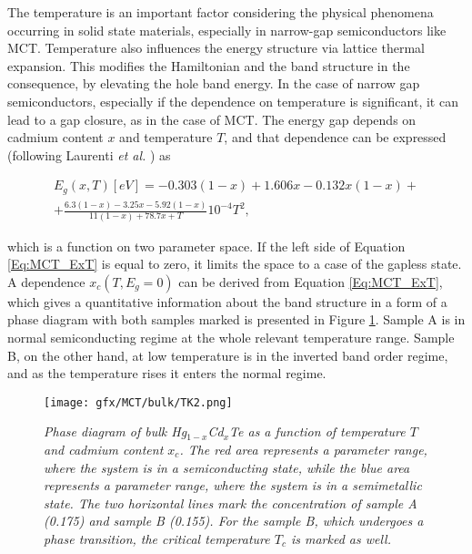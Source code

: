 \documentclass[titlepage,a4paper]{book}
\begin{document}
The temperature is an important factor considering the physical phenomena occurring in solid state materials, especially in narrow-gap semiconductors like MCT. Temperature also influences the energy structure via lattice thermal expansion. This modifies the Hamiltonian and the band structure in the consequence, by elevating the hole band energy. In the case of narrow gap semiconductors, especially if the dependence on temperature is significant, it can lead to a gap closure, as in the case of MCT. The energy gap depends on cadmium content $x$ and temperature $T$, and that dependence can be expressed (following Laurenti \textit{et al.} \cite{Laurenti_MCT_bulk}) as

\begin{equation}
\begin{aligned}
\label{Eq:MCT_ExT}
E_g (x,T)[eV] = -0.303(1-x) + 1.606x - 0.132x(1-x) +\\ +\frac{6.3(1-x)-3.25x-5.92(1-x)}{11(1-x)+78.7x+T}10^{-4}T^2,
\end{aligned}
\end{equation}

which is a function on two parameter space. If the left side of Equation \ref{Eq:MCT_ExT} is equal to zero, it limits the space to a case of the gapless state. A dependence $x_c(T, E_g = 0)$ can be derived from Equation \ref{Eq:MCT_ExT}, which gives a quantitative information about the band structure in a form of a phase diagram with both samples marked is presented in Figure \ref{fig:TK2}. Sample A is in normal semiconducting regime at the whole relevant temperature range. Sample B, on the other hand, at low temperature is in the inverted band order regime, and as the temperature rises it enters the normal regime. 

\begin{figure}[H]
	\centering
	\texttt{[image: gfx/MCT/bulk/TK2.png]}
	\vspace{-10pt}
	\caption{\textit{Phase diagram of bulk Hg$_{1-x}$Cd$_x$Te as a function of temperature $T$ and cadmium content $x_c$. The red area represents a parameter range, where the system is in a semiconducting state, while the blue area represents a parameter range, where the system is in a semimetallic state. The two horizontal lines mark the concentration of sample A (0.175) and sample B (0.155). For the sample B, which undergoes a phase transition, the critical temperature $T_c$ is marked as well.}}
	\label{fig:TK2}
\end{figure} 
\end{document}
